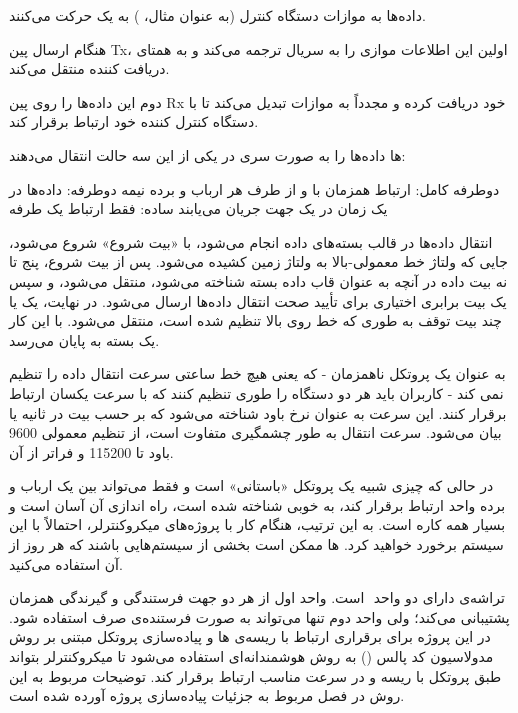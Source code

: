  داده‌ها به موازات دستگاه کنترل (به عنوان مثال، ) به یک  حرکت می‌کنند.

 هنگام ارسال پین Tx، اولین  این اطلاعات موازی را به سریال ترجمه می‌کند و به همتای دریافت کننده منتقل می‌کند.

  دوم این داده‌ها را روی پین Rx خود دریافت کرده و مجدداً به موازات تبدیل می‌کند تا با دستگاه کنترل کننده خود ارتباط برقرار کند.


ها
داده‌ها را به صورت سری در یکی از این سه حالت انتقال می‌دهند:

دوطرفه کامل: ارتباط همزمان با و از طرف هر ارباب و برده
 نیمه دوطرفه: داده‌ها در یک زمان در یک جهت جریان می‌یابند
ساده: فقط ارتباط یک طرفه

انتقال داده‌ها در قالب بسته‌های داده انجام می‌شود، با «بیت شروع» شروع می‌شود، جایی که ولتاژ خط معمولی-بالا به ولتاژ زمین کشیده می‌شود. پس از بیت شروع، پنج تا نه بیت داده در آنچه به عنوان قاب داده بسته شناخته می‌شود، منتقل می‌شود، و سپس یک بیت برابری اختیاری برای تأیید صحت انتقال داده‌ها ارسال می‌شود. در نهایت، یک یا چند بیت توقف به طوری که خط روی بالا تنظیم شده است، منتقل می‌شود. با این کار یک بسته به پایان می‌رسد.

به عنوان یک پروتکل ناهمزمان - که یعنی هیچ خط ساعتی سرعت انتقال داده را تنظیم نمی کند - کاربران باید هر دو دستگاه را طوری تنظیم کنند که با سرعت یکسان ارتباط برقرار کنند. این سرعت به عنوان نرخ باود شناخته می‌شود که بر حسب بیت در ثانیه یا  بیان می‌شود. سرعت انتقال به طور چشمگیری متفاوت است، از تنظیم معمولی 9600 باود تا 115200 و فراتر از آن.

در حالی که چیزی شبیه یک پروتکل «باستانی» است و فقط می‌تواند بین یک ارباب و برده واحد ارتباط برقرار کند، به خوبی شناخته شده است، راه اندازی آن آسان است و بسیار همه کاره است. به این ترتیب، هنگام کار با پروژه‌های میکروکنترلر، احتمالاً با این سیستم برخورد خواهید کرد. ها ممکن است بخشی از سیستم‌هایی باشند که هر روز از آن استفاده می‌کنید.

تراشه‌ی  دارای دو واحد ‌ است. واحد اول از هر دو جهت فرستندگی و گیرندگی همزمان پشتیبانی می‌کند؛ ولی واحد دوم تنها می‌تواند به صورت فرستنده‌ی صرف استفاده شود. در این پروژه برای برقراری ارتباط با ریسه‌ی ها و پیاده‌سازی پروتکل مبتنی بر روش مدولاسیون کد پالس () به روش هوشمندانه‌ای استفاده می‌شود تا میکروکنترلر بتواند طبق پروتکل با ریسه و در سرعت مناسب ارتباط برقرار کند. توضیحات مربوط به این روش در فصل مربوط به جزئیات پیاده‌سازی پروژه آورده شده است.

